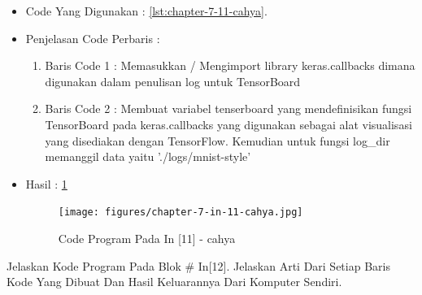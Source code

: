 \begin{itemize}
\item Code Yang Digunakan : \ref{lst:chapter-7-11-cahya}.

\par
\par
\item Penjelasan Code Perbaris	: 
\begin{enumerate}
\item Baris Code 1	: Memasukkan / Mengimport library keras.callbacks dimana digunakan dalam penulisan log untuk TensorBoard
\item Baris Code 2	: Membuat variabel tenserboard yang mendefinisikan fungsi TensorBoard pada keras.callbacks yang digunakan sebagai alat visualisasi yang disediakan dengan TensorFlow. Kemudian untuk fungsi log\_dir memanggil data yaitu './logs/mnist-style'
\end{enumerate}
\par
\item Hasil : \ref{chapter-7-in-11-cahya}
\par
\par
\begin{figure}[!hbtp]
\centering
\texttt{[image: figures/chapter-7-in-11-cahya.jpg]}
\caption{Code Program Pada In [11] - cahya}
\label{chapter-7-in-11-cahya}
\end{figure}
\par
\par
\end{itemize}
\par
\par
\par
\item Jelaskan Kode Program Pada Blok \# In[12]. Jelaskan Arti Dari Setiap Baris Kode Yang Dibuat Dan Hasil Keluarannya Dari Komputer Sendiri.
